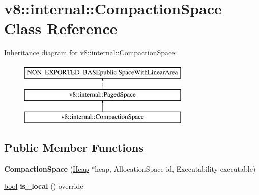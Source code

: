 \hypertarget{classv8_1_1internal_1_1CompactionSpace}{}\section{v8\+:\+:internal\+:\+:Compaction\+Space Class Reference}
\label{classv8_1_1internal_1_1CompactionSpace}
Inheritance diagram for v8\+:\+:internal\+:\+:Compaction\+Space\+:\begin{figure}[H]
\begin{center}
\leavevmode
\includegraphics[height=3.000000cm]{classv8_1_1internal_1_1CompactionSpace}
\end{center}
\end{figure}
\subsection*{Public Member Functions}
\begin{DoxyCompactItemize}
\item 
\mbox{\label{classv8_1_1internal_1_1CompactionSpace_a34df47197780afe9d9c6f995d3ff77eb}} 
{\bfseries Compaction\+Space} (\mbox{\hyperlink{classv8_1_1internal_1_1Heap}{Heap}} $\ast$heap, Allocation\+Space id, Executability executable)
\item 
\mbox{\label{classv8_1_1internal_1_1CompactionSpace_a8cc7c214df5d3c754bd2c80dcda73bef}} 
\mbox{\hyperlink{classbool}{bool}} {\bfseries is\+\_\+local} () override
\end{DoxyCompactItemize}
